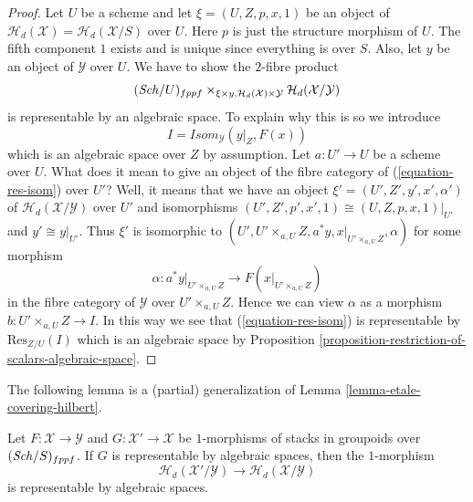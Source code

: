 \begin{proof}
Let $U$ be a scheme and let $\xi = (U, Z, p, x, 1)$ be an object of
$\mathcal{H}_d(\mathcal{X}) = \mathcal{H}_d(\mathcal{X}/S)$ over $U$.
Here $p$ is just the structure morphism of $U$.
The fifth component $1$ exists and is unique
since everything is over $S$.
Also, let $y$ be an object of $\mathcal{Y}$ over $U$.
We have to show the $2$-fibre product
\begin{equation}
\label{equation-res-isom}
(\mathit{Sch}/U)_{fppf}
\times_{\xi \times y, \mathcal{H}_d(\mathcal{X}) \times \mathcal{Y}}
\mathcal{H}_d(\mathcal{X}/\mathcal{Y})
\end{equation}
is representable by an algebraic space. To explain why this is so
we introduce
$$
I = \mathit{Isom}_\mathcal{Y}(y|_Z, F(x))
$$
which is an algebraic space over $Z$ by assumption. Let $a : U' \to U$
be a scheme over $U$. What does it mean to give an object of the fibre
category of (\ref{equation-res-isom}) over $U'$? Well, it means that we
have an object $\xi' = (U', Z', y', x', \alpha')$ of
$\mathcal{H}_d(\mathcal{X}/\mathcal{Y})$ over $U'$ and isomorphisms
$(U', Z', p', x', 1) \cong (U, Z, p, x, 1)|_{U'}$ and
$y' \cong y|_{U'}$. Thus $\xi'$ is isomorphic to
$(U', U' \times_{a, U} Z, a^*y, x|_{U' \times_{a, U} Z}, \alpha)$
for some morphism
$$
\alpha :
a^*y|_{U' \times_{a, U} Z}
\longrightarrow
F(x|_{U' \times_{a, U} Z})
$$
in the fibre category of $\mathcal{Y}$ over $U' \times_{a, U} Z$. Hence
we can view $\alpha$ as a morphism $b : U' \times_{a, U} Z \to I$.
In this way we see that (\ref{equation-res-isom})
is representable by $\text{Res}_{Z/U}(I)$ which is an algebraic space by
Proposition \ref{proposition-restriction-of-scalars-algebraic-space}.
\end{proof}

\noindent
The following lemma is a (partial) generalization of
Lemma \ref{lemma-etale-covering-hilbert}.

\begin{lemma}
\label{lemma-representable-on-top}
Let $F : \mathcal{X} \to \mathcal{Y}$ and $G : \mathcal{X}' \to \mathcal{X}$
be $1$-morphisms of stacks in groupoids over $(\mathit{Sch}/S)_{fppf}$.
If $G$ is representable by algebraic spaces, then the $1$-morphism
$$
\mathcal{H}_d(\mathcal{X}'/\mathcal{Y})
\longrightarrow
\mathcal{H}_d(\mathcal{X}/\mathcal{Y})
$$
is representable by algebraic spaces.
\end{lemma}

